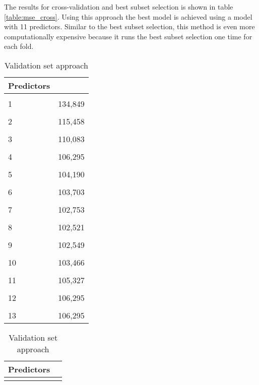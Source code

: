 The results for cross-validation and best subset selection is shown in table \ref{table:mse_cross}. Using this approach the best model is achieved using a model with 11 predictors. Similar to the best subset selection, this method is even more computationally expensive because it runs the best subset selection one time for each fold.

\begin{table}	
	\centering
	\begin{subtable}[t]{2in}
		\centering
		\begin{tabular}{ p{3cm} p{3cm}  }
			\textbf{Predictors} & \text{MSE} \\
			\hline 
			\\
			1 & 134,849 \\\hline
			\\
			2 & 115,458 \\\hline
			\\
			3 & 110,083 \\\hline
			\\
			4 & 106,295  \\\hline
			\\
			5 & 104,190  \\\hline
			\\
			6 & 103,703  \\\hline
			\\
			7 & 102,753  \\\hline
			\\
			8 & 102,521  \\\hline
			\\
			9 & 102,549  \\\hline
			\\
			10 & 103,466  \\\hline
			\\
			11 & 105,327  \\\hline
			\\
			12 & 106,295  \\\hline
			\\
			13 & 106,295  \\\hline
		\end{tabular}
		\caption{Validation set approach}\label{table:mse_validation}
	\end{subtable}
	\quad
	\begin{subtable}[t]{2in}
		\centering
	\begin{tabular}{ p{3cm} p{3cm}  }
		\textbf{Predictors} & \text{MSE} \\
		\hline 
		\\

\end{tabular}
\end{subtable}
\end{table}
